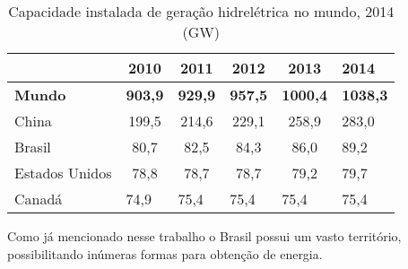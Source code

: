 \begin{table}[!ht]
	\centering
	\begin{tabular}{lccccl}
		\rowcolor[HTML]{9B9B9B} 
		\multicolumn{1}{c}{\cellcolor[HTML]{9B9B9B}} & {\color[HTML]{FFFFFF} \textbf{2010}} & {\color[HTML]{FFFFFF} \textbf{2011}} & {\color[HTML]{FFFFFF} \textbf{2012}} & {\color[HTML]{FFFFFF} \textbf{2013}} & {\color[HTML]{FFFFFF} \textbf{2014}} \\ \hline
		\textbf{Mundo}                               & \multicolumn{1}{l}{\textbf{903,9}}   & \multicolumn{1}{l}{\textbf{929,9}}   & \multicolumn{1}{l}{\textbf{957,5}}   & \multicolumn{1}{l}{\textbf{1000,4}}  & \textbf{1038,3}                      \\ \hline
		\rowcolor[HTML]{DDDDDD} 
		China                                        & 199,5                                & 214,6                                & 229,1                                & 258,9                                & 283,0                                \\
		Brasil                                       & 80,7                                 & 82,5                                 & 84,3                                 & 86,0                                 & 89,2                                 \\
		\rowcolor[HTML]{DDDDDD} 
		Estados Unidos                               & 78,8                                 & 78,7                                 & 78,7                                 & 79,2                                 & 79,7                                 \\
		Canadá                                       & \multicolumn{1}{l}{74,9}             & \multicolumn{1}{l}{75,4}             & \multicolumn{1}{l}{75,4}             & \multicolumn{1}{l}{75,4}             & 75,4                                
	\end{tabular}
	\caption{Capacidade instalada de geração hidrelétrica no mundo, 2014 (GW)}
	\label{cap_hidro}
\end{table}

Como já mencionado nesse trabalho o Brasil possui um vasto território, possibilitando inúmeras formas para obtenção de energia. 


